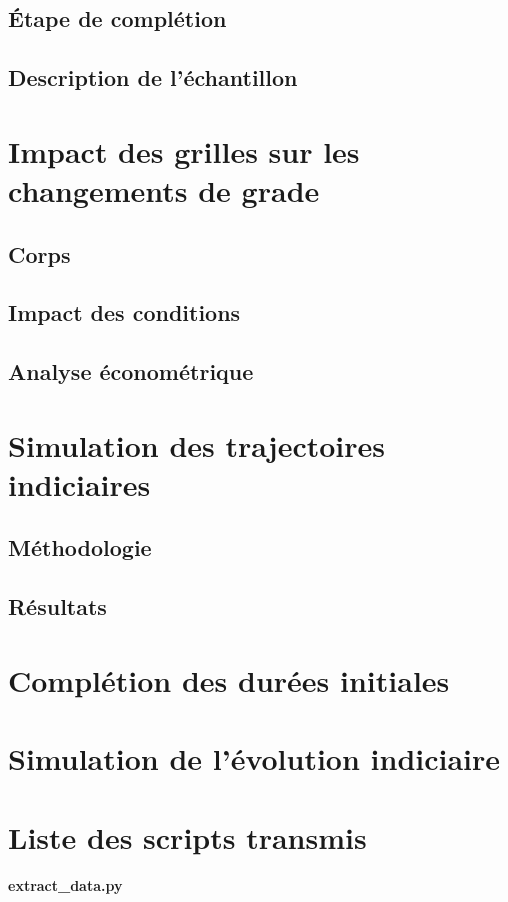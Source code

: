 \documentclass{article}
\begin{document}
\subsection{Étape de complétion}


\subsection{Description de l'échantillon}


\section{Impact des grilles sur les changements de grade}

\subsection{Corps}

\subsection{Impact des conditions}

\subsection{Analyse économétrique}



\section{Simulation des trajectoires indiciaires}

\subsection{Méthodologie}

\subsection{Résultats}



\appendix

\section{Complétion des durées initiales}


\section{Simulation de l'évolution indiciaire}

\section{Liste des scripts transmis}

\paragraph{extract_data.py}



\end{document}
